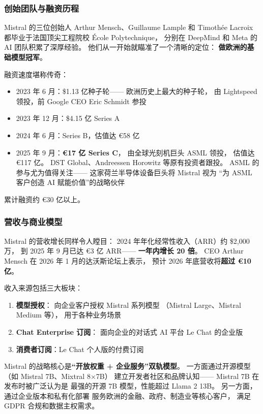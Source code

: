 \subsubsection{创始团队与融资历程}

Mistral 的三位创始人 Arthur Mensch、Guillaume Lample
和 Timothée Lacroix 都毕业于法国顶尖工程院校
École Polytechnique，
分别在 DeepMind 和 Meta 的 AI 团队积累了深厚经验。
他们从一开始就瞄准了一个清晰的定位：
\textbf{做欧洲的基础模型冠军}。

融资速度堪称传奇：
\begin{itemize}[noitemsep]
  \item 2023 年 6 月：\$1.13 亿种子轮——
        欧洲历史上最大的种子轮，
        由 Lightspeed 领投，前 Google CEO Eric Schmidt 参投
  \item 2023 年 12 月：\$4.15 亿 Series A
  \item 2024 年 6 月：Series B，估值达 €58 亿
  \item 2025 年 9 月：\textbf{€17 亿 Series C}，
        由全球光刻机巨头 ASML 领投，
        估值达 €117 亿。
        DST Global、Andreessen Horowitz 等原有投资者跟投。
        ASML 的参与尤为值得关注——
        这家荷兰半导体设备巨头将 Mistral 视为
        ``为 ASML 客户创造 AI 赋能价值''的战略伙伴
\end{itemize}

累计融资约 €30 亿以上。

\subsubsection{营收与商业模型}

Mistral 的营收增长同样令人瞠目：
2024 年年化经常性收入（ARR）约 \$2,000 万，
到 2025 年 9 月已达 €3 亿 ARR——
\textbf{一年内增长 20 倍}。
CEO Arthur Mensch 在 2026 年 1 月的达沃斯论坛上表示，
预计 2026 年底营收将\textbf{超过 €10 亿}。

收入来源包括三大板块：
\begin{enumerate}[noitemsep]
  \item \textbf{模型授权}：
        向企业客户授权 Mistral 系列模型
        （Mistral Large、Mistral Medium 等），
        用于各种业务场景
  \item \textbf{Chat Enterprise 订阅}：
        面向企业的对话式 AI 平台 Le Chat 的企业版
  \item \textbf{消费者订阅}：Le Chat 个人版的付费订阅
\end{enumerate}

Mistral 的战略核心是\textbf{``开放权重 + 企业服务''双轨模型}。
一方面通过开源模型（如 Mistral 7B、Mixtral 8$\times$7B）
建立开发者社区和品牌认知——
Mistral 7B 在发布时被广泛认为是
最强的开源 7B 模型，性能超过 Llama 2 13B。
另一方面，通过企业版本和私有化部署
服务欧洲的金融、政府、制造业等核心客户，
满足 GDPR 合规和数据主权需求。

